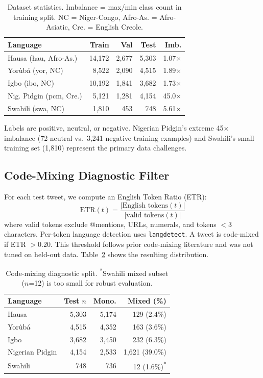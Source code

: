 \documentclass[11pt,twocolumn]{article}
\begin{document}
\begin{table}[t]
\centering
\small
\setlength{\tabcolsep}{3pt}
\begin{tabular}{lrrrr}
\toprule
\textbf{Language} & \textbf{Train} & \textbf{Val} & \textbf{Test} & \textbf{Imb.} \\
\midrule
Hausa (hau, Afro-As.)   & 14,172 & 2,677 & 5,303 & 1.07$\times$ \\
Yor\`{u}b\'{a} (yor, NC) &  8,522 & 2,090 & 4,515 & 1.89$\times$ \\
Igbo (ibo, NC)           & 10,192 & 1,841 & 3,682 & 1.73$\times$ \\
Nig. Pidgin (pcm, Cre.)  &  5,121 & 1,281 & 4,154 & 45.0$\times$ \\
Swahili (swa, NC)        &  1,810 &   453 &   748 & 5.61$\times$ \\
\bottomrule
\end{tabular}
\caption{Dataset statistics. Imbalance = max/min class count in training split. NC = Niger-Congo, Afro-As. = Afro-Asiatic, Cre. = English Creole.}
\label{tab:dataset}
\end{table}

Labels are positive, neutral, or negative. Nigerian Pidgin's extreme 45$\times$ imbalance
(72 neutral vs.\ 3,241 negative training examples) and Swahili's small training set (1,810)
represent the primary data challenges.

\subsection{Code-Mixing Diagnostic Filter}

For each test tweet, we compute an English Token Ratio (ETR):
\[
\text{ETR}(t) = \frac{|\text{English tokens}(t)|}{|\text{valid tokens}(t)|}
\]
where valid tokens exclude @mentions, URLs, numerals, and tokens $<$3 characters.
Per-token language detection uses \texttt{langdetect}. A tweet is code-mixed if ETR $> 0.20$.
This threshold follows prior code-mixing literature and was not tuned on held-out data.
Table~\ref{tab:cmi} shows the resulting distribution.

\begin{table}[t]
\centering
\small
\setlength{\tabcolsep}{3pt}
\begin{tabular}{lrrr}
\toprule
\textbf{Language} & \textbf{Test $n$} & \textbf{Mono.} & \textbf{Mixed (\%)} \\
\midrule
Hausa           & 5,303 & 5,174 & 129 (2.4\%)  \\
Yor\`{u}b\'{a} & 4,515 & 4,352 & 163 (3.6\%)  \\
Igbo            & 3,682 & 3,450 & 232 (6.3\%)  \\
Nigerian Pidgin & 4,154 & 2,533 & 1,621 (39.0\%) \\
Swahili         &   748 &   736 &  12 (1.6\%)\textsuperscript{*}  \\
\bottomrule
\end{tabular}
\caption{Code-mixing diagnostic split. \textsuperscript{*}Swahili mixed subset ($n$=12) is
too small for robust evaluation.}
\label{tab:cmi}
\end{table}
\end{document}
